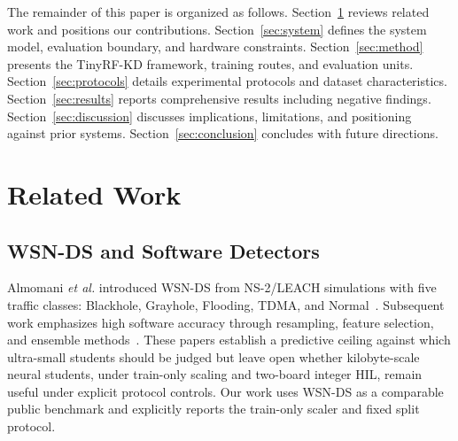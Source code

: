 \documentclass[journal]{IEEEtran}
\newcommand{\method}{TinyRF-KD}
\newcommand{\dataset}{WSN-DS}
\begin{document}
The remainder of this paper is organized as follows.
Section~\ref{sec:related} reviews related work and positions our contributions.
Section~\ref{sec:system} defines the system model, evaluation boundary, and hardware constraints.
Section~\ref{sec:method} presents the \method{} framework, training routes, and evaluation units.
Section~\ref{sec:protocols} details experimental protocols and dataset characteristics.
Section~\ref{sec:results} reports comprehensive results including negative findings.
Section~\ref{sec:discussion} discusses implications, limitations, and positioning against prior systems.
Section~\ref{sec:conclusion} concludes with future directions.

\section{Related Work}
\label{sec:related}

\subsection{WSN-DS and Software Detectors}
Almomani \emph{et al.} introduced \dataset{} from NS-2/LEACH simulations with five traffic classes: Blackhole, Grayhole, Flooding, TDMA, and Normal~\cite{almomani2016wsnds}.
Subsequent work emphasizes high software accuracy through resampling, feature selection, and ensemble methods~\cite{talukder2024mlstl,talukder2025hybrid,nguyen2024gswo,alqahtani2019gxgboost,birahim2025pso,pandey2025tabu,xiao2025ensemble,salmi2022cnnlstm}.
These papers establish a predictive ceiling against which ultra-small students should be judged but leave open whether kilobyte-scale neural students, under train-only scaling and two-board integer HIL, remain useful under explicit protocol controls.
Our work uses \dataset{} as a comparable public benchmark and explicitly reports the train-only scaler and fixed split protocol.
\end{document}
